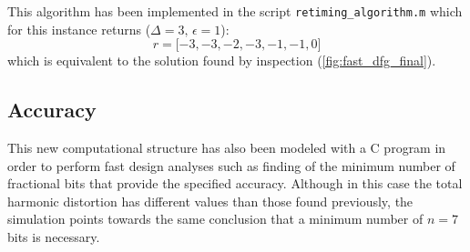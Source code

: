 This algorithm has been implemented in the script \texttt{retiming\_algorithm.m} which for this instance returns ($\Delta=3, \,\epsilon=1$):
\begin{equation*}
r = {[}-3, -3, -2, -3, -1, -1, 0{]}
\end{equation*}
which is equivalent to the solution found by inspection (\autoref{fig:fast_dfg_final}).
\subsection{Accuracy}
This new computational structure has also been modeled with a C program in order to perform fast design analyses such as finding of the minimum number of fractional bits that provide the specified accuracy. Although in this case the total harmonic distortion has different values than those found previously, the simulation points towards the same conclusion that a minimum number of $n=7$ bits is necessary.
